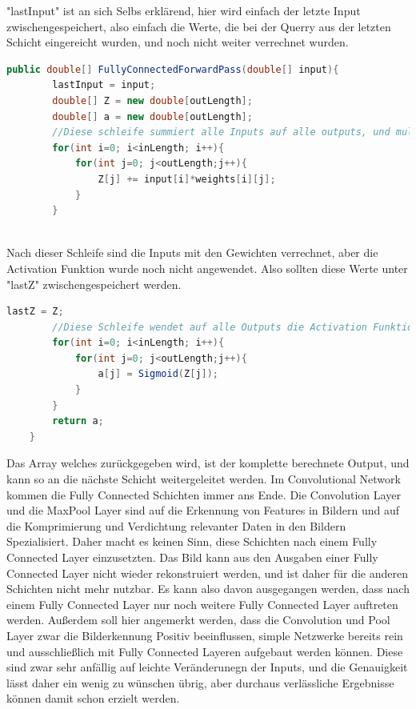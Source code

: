 \documentclass[12pt]{article}
\begin{document}
"lastInput" ist an sich Selbs erklärend, hier wird einfach der letzte Input zwischengespeichert, also einfach die Werte, die bei der Querry aus der letzten Schicht eingereicht wurden, und noch nicht weiter verrechnet wurden.
\clearpage
\begin{lstlisting}[language=Java]
    public double[] FullyConnectedForwardPass(double[] input){
        lastInput = input;
        double[] Z = new double[outLength];
        double[] a = new double[outLength];
        //Diese schleife summiert alle Inputs auf alle outputs, und multipliziert die Inputs mit ihren jeweiligen gewichten aus der weights-Matrix
        for(int i=0; i<inLength; i++){
            for(int j=0; j<outLength;j++){
                Z[j] += input[i]*weights[i][j];
            }
        }
        
\end{lstlisting}
Nach dieser Schleife sind die Inputs mit den Gewichten verrechnet, aber die Activation Funktion wurde noch nicht angewendet. Also sollten diese Werte unter "lastZ" zwischengespeichert werden.
\begin{lstlisting}[language=Java] 
        lastZ = Z;
		//Diese Schleife wendet auf alle Outputs die Activation Funktion an, in diesem Falle die Sigmoid Funktion
        for(int i=0; i<inLength; i++){
            for(int j=0; j<outLength;j++){
                a[j] = Sigmoid(Z[j]);
            }
        }
        return a;
    }
\end{lstlisting} 

Das Array welches zurückgegeben wird, ist der komplette berechnete Output, und kann so an die nächste Schicht weitergeleitet werden. Im Convolutional Network kommen die Fully Connected Schichten immer ans Ende. Die Convolution Layer und die MaxPool Layer sind auf die Erkennung von Features in Bildern und auf die Komprimierung und Verdichtung relevanter Daten in den Bildern Spezialisiert. Daher macht es keinen Sinn, diese Schichten nach einem Fully Connected Layer einzusetzten. Das Bild kann aus den Ausgaben einer Fully Connected Layer nicht wieder rekonstruiert werden, und ist daher für die anderen Schichten nicht mehr nutzbar. Es kann also davon ausgegangen werden, dass nach einem Fully Connected Layer nur noch weitere Fully Connected Layer auftreten werden. 
Außerdem soll hier angemerkt werden, dass die Convolution und Pool Layer zwar die Bilderkennung Positiv beeinflussen, simple Netzwerke bereits rein und ausschließlich mit Fully Connected Layeren aufgebaut werden können. Diese sind zwar sehr anfällig auf leichte Veränderunegn der Inputs, und die Genauigkeit lässt daher ein wenig zu wünschen übrig, aber durchaus verlässliche Ergebnisse können damit schon erzielt werden.
\end{document}
